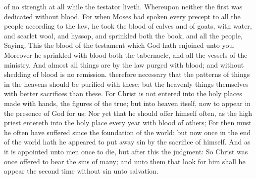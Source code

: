 {of
no
strength at
all
while the
testator
liveth.
Whereupon
neither the
first
{} was
dedicated
without
blood.
For
when
Moses had
spoken
every
precept
to
all the
people according
to the
law, he
took the
blood of
calves
and of
goats,
with
water,
and
scarlet
wool,
and
hyssop, and
sprinkled
both the
book,
and
all the
people,
Saying,
This
{} the
blood of the
testament
which
God hath
enjoined
unto
you.
Moreover he
sprinkled with
blood
both the
tabernacle,
and
all the
vessels of the
ministry.
And
almost all
things
are
by the
law
purged
with
blood;
and
without shedding of
blood
is
no
remission.
therefore necessary
that the
patterns of
things
in the
heavens should be
purified with
these;
but the heavenly
things
themselves
with
better
sacrifices
than
these.
For
Christ
is
not
entered
into the holy
places made with
hands,
{} the
figures of the
true;
but
into
heaven
itself,
now to
appear in the
presence of
God
for
us:
Nor
yet
that he should
offer
himself
often,
as the high
priest
entereth
into the holy
place
every
year
with
blood of
others;
For
then
must
he
often have
suffered
since the
foundation of the
world:
but
now
once
in the
end of the
world hath he
appeared
to put
away
sin
by the
sacrifice of
himself.
And
as it is
appointed unto
men
once to
die,
but
after
this the
judgment:
So
Christ
was
once
offered
to
bear the
sins of
many; and unto them that look
for
him shall he
appear the second
time
without
sin
unto
salvation.

}
